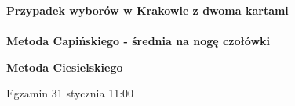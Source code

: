\documentclass[12pt,a4paper]{article}
\theoremstyle{break}
\begin{document}
		{\textbf{Przypadek wyborów w Krakowie z dwoma kartami}}\\\\
		
		{\textbf{Metoda Capińskiego - średnia na nogę czołówki}}
		
		{\textbf{Metoda Ciesielskiego}}
	\begin{center}
		{\fontsize{30}{36}\selectfont\faBirthdayCake}
	\end{center} 
	
	Egzamin 31 stycznia 11:00
	
		
	
	

	
	
\end{document}
